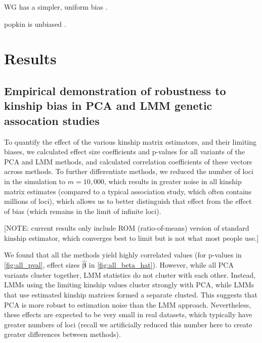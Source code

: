 \documentclass[11pt]{article}
\begin{document}
WG has a simpler, uniform bias \citep{weir_unified_2017, ochoa_estimating_2021}.

popkin is unbiased  \citep{ochoa_estimating_2021}.

\section{Results}

\subsection{Empirical demonstration of robustness to kinship bias in PCA and LMM genetic assocation studies}

To quantify the effect of the various kinship matrix estimators, and their limiting biases, we calculated effect size coefficients and p-values for all variants of the PCA and LMM methods, and calculated correlation coefficients of these vectors across methods.
To further differentiate methods, we reduced the number of loci in the simulation to $m=10,000$, which results in greater noise in all kinship matrix estimates (compared to a typical association study, which often contains millions of loci), which allows us to better distinguish that effect from the effect of bias (which remains in the limit of infinite loci).

[NOTE: current results only include ROM (ratio-of-means) version of standard kinship estimator, which converges best to limit but is not what most people use.]

We found that all the methods yield highly correlated values (for p-values in \cref{fig:all_pval}, effect sizes $\hat{\mathbf{\beta}}$ in \cref{fig:all_beta_hat}).
However, while all PCA variants cluster together, LMM statistics do not cluster with each other.
Instead, LMMs using the limiting kinship values cluster strongly with PCA, while LMMs that use estimated kinship matrices formed a separate clusted.
This suggests that PCA is more robust to estimation noise than the LMM approach.
Nevertheless, these effects are expected to be very small in real datasets, which typically have greater numbers of loci (recall we artificially reduced this number here to create greater differences between methods).
\end{document}
